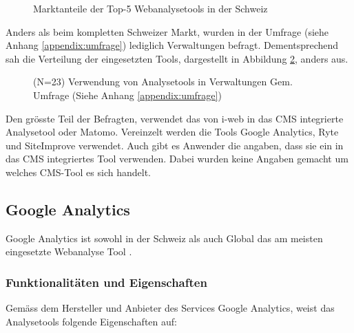 \begin{figure}[h]
  \centering
{}
\caption{Marktanteile der Top-5 Webanalysetools in der Schweiz \parencite{datanyzeSwitzerlandWebanalytics}}
\label{fig:marktanteil}
\end{figure}


Anders als beim kompletten Schweizer Markt, wurden in der Umfrage (siehe Anhang \ref{appendix:umfrage}) lediglich Verwaltungen befragt. Dementsprechend sah die Verteilung der eingesetzten Tools, dargestellt in Abbildung \ref{fig:verwVerteilungTools}, anders aus.

\begin{figure}[h]
  \centering
{}
\caption{(N=23) Verwendung von Analysetools in Verwaltungen Gem. Umfrage (Siehe Anhang \ref{appendix:umfrage})}
\label{fig:verwVerteilungTools}
\end{figure}

Den grösste Teil der Befragten, verwendet das von i-web in das CMS integrierte Analysetool oder Matomo. Vereinzelt werden die Tools Google Analytics, Ryte und SiteImprove verwendet. Auch gibt es Anwender die angaben, dass sie ein in das CMS integriertes Tool verwenden. Dabei wurden keine Angaben gemacht um welches CMS-Tool es sich handelt. 


\subsection{Google Analytics}\label{subsec:GoogleAnalytics}
Google Analytics ist sowohl in der Schweiz als auch Global das am meisten eingesetzte Webanalyse Tool \parencite{datanyzeSwitzerlandWebanalytics}. 

\subsubsection{Funktionalitäten und Eigenschaften}
Gemäss dem Hersteller und Anbieter des Services Google Analytics, weist das Analysetools folgende Eigenschaften auf:

